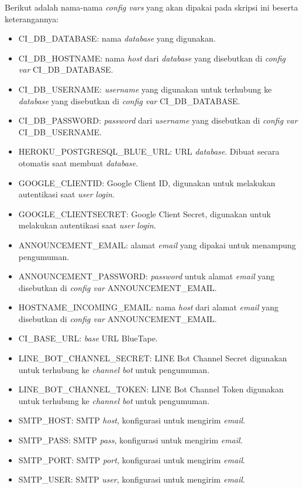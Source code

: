 		Berikut adalah nama-nama \textit{config vars} yang akan dipakai pada skripsi ini beserta keterangannya: 
		\begin{itemize}
			\item CI\_DB\_DATABASE: nama \textit{database} yang digunakan.
			\item CI\_DB\_HOSTNAME: nama \textit{host} dari \textit{database} yang disebutkan di \textit{config var} CI\_DB\_DATABASE.
			\item CI\_DB\_USERNAME: \textit{username} yang digunakan untuk terhubung ke \textit{database} yang disebutkan di \textit{config var} CI\_DB\_DATABASE.
			\item CI\_DB\_PASSWORD: \textit{password} dari \textit{username} yang disebutkan di \textit{config var} CI\_DB\_USERNAME.
			\item HEROKU\_POSTGRESQL\_BLUE\_URL: URL \textit{database}. Dibuat secara otomatis saat membuat \textit{database}.
			\item GOOGLE\_CLIENTID: Google Client ID, digunakan untuk melakukan autentikasi saat \textit{user} \textit{login}.
			\item GOOGLE\_CLIENTSECRET: Google Client Secret, digunakan untuk melakukan autentikasi saat \textit{user} \textit{login}.
			\item ANNOUNCEMENT\_EMAIL: alamat \textit{email} yang dipakai untuk menampung pengumuman.
			\item ANNOUNCEMENT\_PASSWORD: \textit{password} untuk alamat \textit{email} yang disebutkan di \textit{config var} ANNOUNCEMENT\_EMAIL.
			\item HOSTNAME\_INCOMING\_EMAIL: nama \textit{host} dari alamat \textit{email} yang disebutkan di \textit{config var} ANNOUNCEMENT\_EMAIL.
			\item CI\_BASE\_URL: \textit{base} URL BlueTape.
			\item LINE\_BOT\_CHANNEL\_SECRET: LINE Bot Channel Secret digunakan untuk terhubung ke \textit{channel bot} untuk pengumuman.
			\item LINE\_BOT\_CHANNEL\_TOKEN: LINE Bot Channel Token digunakan untuk terhubung ke \textit{channel bot} untuk pengumuman.
			\item SMTP\_HOST: SMTP \textit{host}, konfigurasi untuk mengirim \textit{email}.
			\item SMTP\_PASS: SMTP \textit{pass}, konfigurasi untuk mengirim \textit{email}.
			\item SMTP\_PORT: SMTP \textit{port}, konfigurasi untuk mengirim \textit{email}.
			\item SMTP\_USER: SMTP \textit{user}, konfigurasi untuk mengirim \textit{email}.
		\end{itemize}
		
